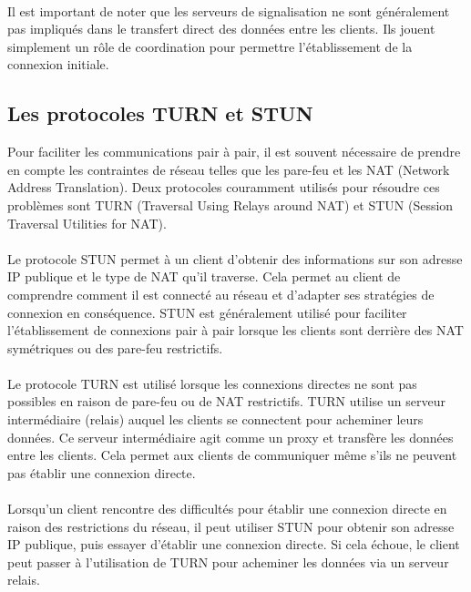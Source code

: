 \paragraph{}
Il est important de noter que les serveurs de signalisation ne sont généralement pas impliqués dans le transfert direct des données entre les clients. Ils jouent simplement un rôle de coordination pour permettre 
l'établissement de la connexion initiale.

\newpage
\subsection{Les protocoles TURN et STUN}

Pour faciliter les communications pair à pair, il est souvent nécessaire de prendre en compte les contraintes de réseau telles que les pare-feu et les NAT (Network Address Translation). Deux protocoles couramment utilisés pour résoudre ces 
problèmes sont TURN (Traversal Using Relays around NAT) et STUN (Session Traversal Utilities for NAT).

\paragraph{}
Le protocole STUN permet à un client d'obtenir des informations sur son adresse IP publique et le type de NAT qu'il traverse. Cela permet au client de comprendre comment il est connecté au réseau et d'adapter ses stratégies de 
connexion en conséquence. STUN est généralement utilisé pour faciliter l'établissement de connexions pair à pair lorsque les clients sont derrière des NAT symétriques ou des pare-feu restrictifs.

\paragraph{}
Le protocole TURN est utilisé lorsque les connexions directes ne sont pas possibles en raison de pare-feu ou de NAT restrictifs. TURN utilise un serveur intermédiaire (relais) auquel les clients se connectent pour acheminer 
leurs données. Ce serveur intermédiaire agit comme un proxy et transfère les données entre les clients. Cela permet aux clients de communiquer même s'ils ne peuvent pas établir une connexion directe.

\paragraph{}
Lorsqu'un client rencontre des difficultés pour établir une connexion directe en raison des restrictions du réseau, il peut utiliser STUN pour obtenir son adresse IP publique, puis essayer d'établir une connexion directe. 
Si cela échoue, le client peut passer à l'utilisation de TURN pour acheminer les données via un serveur relais.

